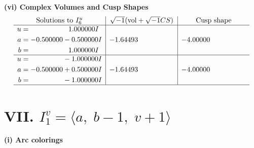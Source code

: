 \documentclass[1p]{elsarticle_modified}
\theoremstyle{definition}
\newcommand{\I}{\sqrt{-1}}
\begin{document}
\newpage\flushleft \textbf{(vi) Complex Volumes and Cusp Shapes}
$$\begin{array}{c|c|c}  
\text{Solutions to }I^u_{6}& \I (\text{vol} + \sqrt{-1}CS) & \text{Cusp shape}\\
 \hline 
\begin{aligned}
u &= \phantom{-0.000000 -}1.000000 I \\
a &= -0.500000 - 0.500000 I \\
b &= \phantom{-0.000000 -}1.000000 I\end{aligned}
 & -1.64493\phantom{ +0.000000I} & -4.00000\phantom{ +0.000000I} \\ \hline\begin{aligned}
u &= \phantom{-0.000000 } -1.000000 I \\
a &= -0.500000 + 0.500000 I \\
b &= \phantom{-0.000000 } -1.000000 I\end{aligned}
 & -1.64493\phantom{ +0.000000I} & -4.00000\phantom{ +0.000000I}\\
 \hline 
 \end{array}$$\newpage\newpage\renewcommand{\arraystretch}{1}
\centering \section*{VII. $I^v_{1}= \langle a,\;b-1,\;v+1 \rangle$}
\flushleft \textbf{(i) Arc colorings}\\
\end{document}
